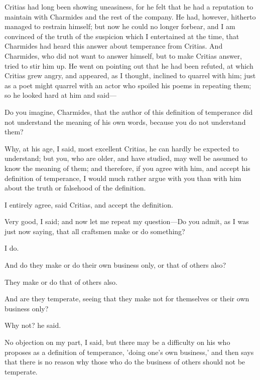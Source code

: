 \documentclass[11pt,letter]{article}
\begin{document}
\par  Critias had long been showing uneasiness, for he felt that he had a reputation to maintain with Charmides and the rest of the company. He had, however, hitherto managed to restrain himself; but now he could no longer forbear, and I am convinced of the truth of the suspicion which I entertained at the time, that Charmides had heard this answer about temperance from Critias. And Charmides, who did not want to answer himself, but to make Critias answer, tried to stir him up. He went on pointing out that he had been refuted, at which Critias grew angry, and appeared, as I thought, inclined to quarrel with him; just as a poet might quarrel with an actor who spoiled his poems in repeating them; so he looked hard at him and said—

\par  Do you imagine, Charmides, that the author of this definition of temperance did not understand the meaning of his own words, because you do not understand them?

\par  Why, at his age, I said, most excellent Critias, he can hardly be expected to understand; but you, who are older, and have studied, may well be assumed to know the meaning of them; and therefore, if you agree with him, and accept his definition of temperance, I would much rather argue with you than with him about the truth or falsehood of the definition.

\par  I entirely agree, said Critias, and accept the definition.

\par  Very good, I said; and now let me repeat my question—Do you admit, as I was just now saying, that all craftsmen make or do something?

\par  I do.

\par  And do they make or do their own business only, or that of others also?

\par  They make or do that of others also.

\par  And are they temperate, seeing that they make not for themselves or their own business only?

\par  Why not? he said.

\par  No objection on my part, I said, but there may be a difficulty on his who proposes as a definition of temperance, 'doing one's own business,' and then says that there is no reason why those who do the business of others should not be temperate.
\end{document}
